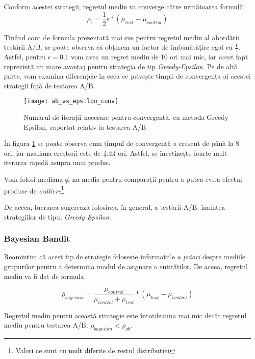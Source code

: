 Conform acestei strategii, regretul mediu va converge către următoarea formulă: \[
	\overline{\rho}_{\epsilon} = \frac{1}{2} \epsilon * (\mu_{text} - \mu_{control}) 
\]

Ținând cont de formula prezentată mai sus pentru regretul mediu al abordării testării A/B, se poate observa că obținem un factor de îmbunătățire egal cu $\frac{1}{\epsilon}$. Astfel, pentru $\epsilon = 0.1$ vom avea un regret mediu de 10 ori mai mic, iar acest fapt reprezintă un mare avantaj pentru strategia de tip \textit{Greedy-Epsilon}. Pe de altă parte, vom examina diferențele în ceea ce privește timpii de convergența ai acestei strategii față de testarea A/B.

\begin{figure}[H]
	\centering
	\texttt{[image: ab\_vs\_epsilon\_conv]}
	\caption{Numărul de iterații necesare pentru convergență, cu metoda Greedy Epsilon, raportat relativ la testarea  A/B}
	\label{fig:ab_vs_epsilon_conv}
\end{figure}

În figura \ref{fig:ab_vs_epsilon_conv} se poate observa cum timpul de convergență a crescut de până la 8 ori, iar mediana creșterii este de \textit{4.24} ori. Astfel, se încetinește foarte mult iterarea rapidă asupra unui produs. 

\begin{remark}
	Vom folosi mediana și nu media pentru comparații pentru a putea evita efectul produse de \textit{outliere}\footnote{Valori ce sunt cu mult diferite de restul distribuției}
\end{remark}

De aceea, lucrarea sugerează folosirea, în general, a testării A/B, înaintea strategiilor de tipul \textit{Greedy Epsilon}.

\subsubsection{Bayesian Bandit}

Reamintim că acest tip de strategie folosește informațiile \textit{a priori} despre mediile grupurilor pentru a determina modul de asignare a entităților. De aceea, regretul mediu va fi dat de formula 

\[
\overline{\rho}_{bayesian} = \frac{\mu_{control}}{\mu_{control} + \mu_{test}} * (\mu_{text} - \mu_{control})
\]

\begin{remark}
	Regretul mediu pentru această strategie este întotdeauna mai mic decât regretul mediu pentru testarea A/B, $\overline{\rho}_{bayesian} < \overline{\rho}_{ab}$.
\end{remark}


